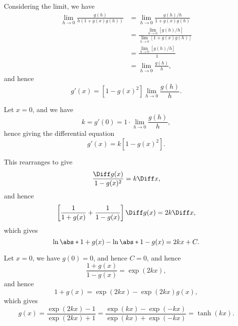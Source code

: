 \begin{enumerate}
          Considering the limit, we have
          \begin{align*}
              \lim_{h \to 0} \frac{g(h)}{h (1 + g(x) g(h))} & = \lim_{h \to 0} \frac{g(h) / h}{1 + g(x) g(h)}                                          \\
                                                            & = \frac{\lim_{h \to 0} \left[g(h) / h\right]}{\lim_{h \to 0} \left[1 + g(x) g(h)\right]} \\
                                                            & = \frac{\lim_{h \to 0} \left[g(h) / h\right]}{1}                                         \\
                                                            & = \lim_{h \to 0} \frac{g(h)}{h},
          \end{align*}
          and hence
          \[
              g'(x) = \left[1 - g(x)^2\right] \lim_{h \to 0} \frac{g(h)}{h}.
          \]

          Let \(x = 0\), and we have
          \[
              k = g'(0) = 1 \cdot \lim_{h \to 0} \frac{g(h)}{h},
          \]
          hence giving the differential equation
          \[
              g'(x) = k \left[1 - g(x)^2\right].
          \]

          This rearranges to give
          \[
              \frac{\Diff g(x)}{1 - g(x)^2} = k \Diff x,
          \]
          and hence
          \[
              \left[\frac{1}{1 + g(x)} + \frac{1}{1 - g(x)}\right] \Diff g(x) = 2 k \Diff x,
          \]
          which gives
          \[
              \ln \abs*{1 + g(x)} - \ln \abs*{1 - g(x)} = 2kx + C.
          \]

          Let \(x = 0\), we have \(g(0) = 0\), and hence \(C = 0\), and hence
          \[
              \frac{1 + g(x)}{1 - g(x)} = \exp(2kx),
          \]
          and hence
          \[
              1 + g(x) = \exp(2kx) - \exp(2kx) g(x),
          \]
          which gives
          \[
              g(x) = \frac{\exp(2kx) - 1}{\exp(2kx) + 1} = \frac{\exp(kx) - \exp(-kx)}{\exp(kx) + \exp(-kx)} = \tanh(kx).
          \]
\end{enumerate}